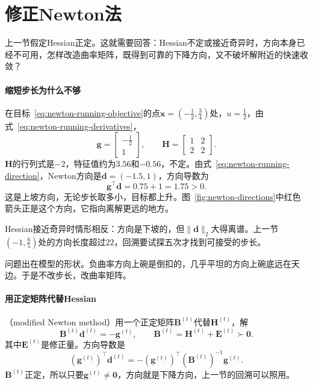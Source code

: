 \section{修正Newton法}
\label{sec:newton-modified}

上一节假定Hessian正定。这就需要回答：Hessian不定或接近奇异时，方向本身已经不可用，怎样改造曲率矩阵，既得到可靠的下降方向，又不破坏解附近的快速收敛？

\paragraph{缩短步长为什么不够}
在目标~\eqref{eq:newton-running-objective}的点$\bm{x}=(-\tfrac12,\tfrac34)$处，$u=\tfrac12$，由式~\eqref{eq:newton-running-derivatives}，
\[
 \bm{g}=\begin{bmatrix}-\tfrac12\\1\end{bmatrix},\qquad
 \bm{H}=\begin{bmatrix}1&2\\2&2\end{bmatrix}.
\]
$\bm{H}$的行列式是$-2$，特征值约为$3.56$和$-0.56$，不定。由式~\eqref{eq:newton-running-direction}，Newton方向是$\bm{d}=(-1.5,1)$，方向导数为
\[
 \bm{g}^\top\bm{d}=0.75+1=1.75>0.
\]
这是上坡方向，无论步长取多小，目标都上升。图~\ref{fig:newton-directions}中红色箭头正是这个方向，它指向离解更远的地方。

Hessian接近奇异时情形相反：方向是下坡的，但$\lVert\bm{d}\rVert_2$大得离谱。上一节$(-1,\tfrac65)$处的方向长度超过$22$，回溯要试探五次才找到可接受的步长。

问题出在模型的形状。负曲率方向上碗是倒扣的，几乎平坦的方向上碗底远在天边。于是不改步长，改曲率矩阵。

\paragraph{用正定矩阵代替Hessian}
（modified Newton method）用一个正定矩阵$\bm{B}^{(t)}$代替$\bm{H}^{(t)}$，解
\begin{equation}
 \bm{B}^{(t)}\bm{d}^{(t)}=-\bm{g}^{(t)},\qquad \bm{B}^{(t)}=\bm{H}^{(t)}+\bm{E}^{(t)}\succ\bm{0}.
 \label{eq:newton-modified-equation}
\end{equation}
其中$\bm{E}^{(t)}$是修正量。方向导数是
\[
 (\bm{g}^{(t)})^\top\bm{d}^{(t)}=-(\bm{g}^{(t)})^\top(\bm{B}^{(t)})^{-1}\bm{g}^{(t)}.
\]
$\bm{B}^{(t)}$正定，所以只要$\bm{g}^{(t)}\neq\bm{0}$，方向就是下降方向，上一节的回溯可以照用。

